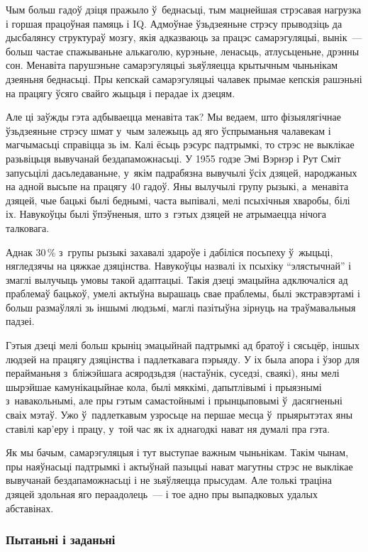 Чым больш гадоў дзіця пражыло ў~беднасьці, тым мацнейшая стрэсавая нагрузка і горшая працоўная памяць і IQ. Адмоўнае ўзьдзеяньне стрэсу прыводзіць да дысбалянсу структураў мозгу, якія адказваюць за працэс самарэгуляцыі, вынік~--- больш частае спажываньне алькаголю, курэньне, ленасьць, атлусьценьне, дрэнны сон. Менавіта парушэньне самарэгуляцыі зьяўляецца крытычным чыньнікам дзеяньня беднасьці. Пры кепскай самарэгуляцыі чалавек прымае кепскія рашэньні на працягу ўсяго свайго жыцьця і перадае іх дзецям.

Але ці заўжды гэта адбываецца менавіта так? Мы ведаем, што фізыялягічнае ўзьдзеяньне стрэсу шмат у~чым залежыць ад яго ўспрыманьня чалавекам і магчымасьці справіцца зь ім. Калі ёсьць рэсурс падтрымкі, то стрэс не выклікае разьвіцьця вывучанай бездапаможнасьці. У 1955 годзе Эмі Вэрнэр і Рут Сміт запусьцілі дасьледаваньне, у~якім падрабязна вывучылі ўсіх дзяцей, народжаных на адной высьпе на працягу 40 гадоў. Яны вылучылі групу рызыкі, а~менавіта дзяцей, чые бацькі былі беднымі, часта выпівалі, мелі псыхічныя хваробы, білі іх. Навукоўцы былі ўпэўненыя, што з~гэтых дзяцей не атрымаецца нічога талковага.

Аднак 30\,\% з~групы рызыкі захавалі здароўе і дабіліся посьпеху ў~жыцьці, нягледзячы на цяжкае дзяцінства. Навукоўцы назвалі іх псыхіку ``элястычнай'' і змаглі вылучыць умовы такой адаптацыі. Такія дзеці эмацыйна адключаліся ад праблемаў бацькоў, умелі актыўна вырашаць свае праблемы, былі экстравэртамі і больш размаўлялі зь іншымі людзьмі, маглі пазітыўна зірнуць на траўмавальныя падзеі.

Гэтыя дзеці мелі больш крыніц эмацыйнай падтрымкі ад братоў і сясьцёр, іншых людзей на працягу дзяцінства і падлеткавага пэрыяду. У іх была апора і ўзор для перайманьня з~бліжэйшага асяродзьдзя (настаўнік, суседзі, сваякі), яны мелі шырэйшае камунікацыйнае кола, былі мяккімі, дапытлівымі і прыязнымі з~навакольнымі, але пры гэтым самастойнымі і прынцыповымі ў~дасягненьні сваіх мэтаў. Ужо ў~падлеткавым узросьце на першае месца ў~прыярытэтах яны ставілі кар'еру і працу, у~той час як іх аднагодкі нават ня думалі пра гэта.

Як мы бачым, самарэгуляцыя і тут выступае важным чыньнікам. Такім чынам, пры наяўнасьці падтрымкі і актыўнай пазыцыі нават магутны стрэс не выклікае вывучанай бездапаможнасьці і не зьяўляецца прысудам. Але толькі траціна дзяцей здольная яго пераадолець~--- і тое адно пры выпадковых удалых абставінах.

\subsubsection{Пытаньні і заданьні}

